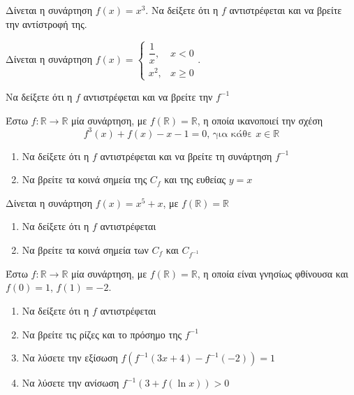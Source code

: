 \documentclass{presentation}
\begin{document}
\begin{askisi}
  Δίνεται η συνάρτηση $f(x)=x^3$. Να δείξετε ότι η $f$ αντιστρέφεται και να βρείτε την αντίστροφή της.
\end{askisi}

\begin{askisi}
  Δίνεται η συνάρτηση $f(x)=\begin{cases}
      \dfrac{1}{x}, & x<0    \\
      x^2,          & x\ge 0
    \end{cases}$.

  Να δείξετε ότι η $f$ αντιστρέφεται και να βρείτε την $f^{-1}$
\end{askisi}

\begin{askisi}
  Έστω $f:\mathbb{R}\to\mathbb{R}$ μία συνάρτηση, με $f(\mathbb{R})=\mathbb{R}$, η οποία ικανοποιεί την σχέση
  $$f^3(x)+f(x)-x-1=0\text{, για κάθε }x\in \mathbb{R}$$
  \begin{enumerate}
    \item Να δείξετε ότι η $f$ αντιστρέφεται και να βρείτε τη συνάρτηση $f^{-1}$ \pause
    \item Να βρείτε τα κοινά σημεία της $C_f$ και της ευθείας $y=x$
  \end{enumerate}
\end{askisi}

\begin{askisi}
  Δίνεται η συνάρτηση $f(x)=x^5+x$, με $f(\mathbb{R})=\mathbb{R}$
  \begin{enumerate}
    \item Να δείξετε ότι η $f$ αντιστρέφεται \pause
    \item Να βρείτε τα κοινά σημεία των $C_f$ και $C_{f^{-1}}$
  \end{enumerate}
\end{askisi}

\begin{askisi}
  Έστω $f:\mathbb{R}\to\mathbb{R}$ μία συνάρτηση, με $f(\mathbb{R})=\mathbb{R}$, η οποία είναι γνησίως φθίνουσα και $f(0)=1$, $f(1)=-2$.
  \begin{enumerate}
    \item Να δείξετε ότι η $f$ αντιστρέφεται \pause
    \item Να βρείτε τις ρίζες και το πρόσημο της $f^{-1}$ \pause
    \item Να λύσετε την εξίσωση $f\left(f^{-1}(3x+4)-f^{-1}(-2)\right)=1$ \pause
    \item Να λύσετε την ανίσωση $f^{-1}\left(3+f(\ln x)\right)>0$
  \end{enumerate}
\end{askisi}
\end{document}
